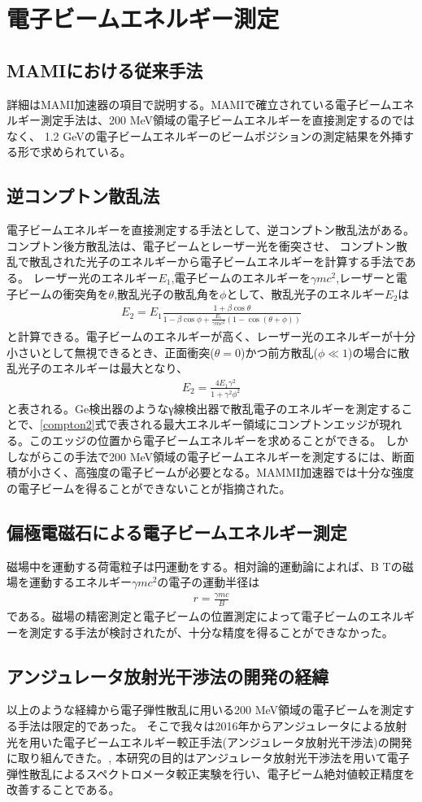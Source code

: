 \documentclass[a4paper,11pt,uplatex]{jsbook}
\begin{document}
\section{電子ビームエネルギー測定}
\subsection{MAMIにおける従来手法}
詳細はMAMI加速器の項目で説明する。MAMIで確立されている電子ビームエネルギー測定手法は、200 MeV領域の電子ビームエネルギーを直接測定するのではなく、
1.2 GeVの電子ビームエネルギーのビームポジションの測定結果を外挿する形で求められている。
\subsection{逆コンプトン散乱法}
電子ビームエネルギーを直接測定する手法として、逆コンプトン散乱法がある。コンプトン後方散乱法は、電子ビームとレーザー光を衝突させ、
コンプトン散乱で散乱された光子のエネルギーから電子ビームエネルギーを計算する手法である。
レーザー光のエネルギー$E_1$,電子ビームのエネルギーを$\gamma mc^2$,レーザーと電子ビームの衝突角を$\theta$,散乱光子の散乱角を$\phi$として、散乱光子のエネルギー$E_2$は
\begin{eqnarray}
  E_2 = E_1\frac{1+\beta\cos{\theta}}{1-\beta\cos{\phi} + \frac{E_1}{\gamma mc^2} (1-\cos{(\theta +\phi)})} \label{compton}
\end{eqnarray}
と計算できる。電子ビームのエネルギーが高く、レーザー光のエネルギーが十分小さいとして無視できるとき、正面衝突($\theta = 0$)かつ前方散乱($\phi \ll 1$)の場合に散乱光子のエネルギーは最大となり、
\begin{eqnarray}
  E_2 = \frac{4E_1\gamma^2}{1 + \gamma^2\phi^2} \label{compton2}
\end{eqnarray}
と表される。Ge検出器のようなγ線検出器で散乱電子のエネルギーを測定することで、\ref{compton2}式で表される最大エネルギー領域にコンプトンエッジが現れる。このエッジの位置から電子ビームエネルギーを求めることができる。
しかしながらこの手法で200 MeV領域の電子ビームエネルギーを測定するには、断面積が小さく、高強度の電子ビームが必要となる。MAMMI加速器では十分な強度の電子ビームを得ることができないことが指摘された。
\subsection{偏極電磁石による電子ビームエネルギー測定}
磁場中を運動する荷電粒子は円運動をする。相対論的運動論によれば、B Tの磁場を運動するエネルギー$\gamma mc^2$の電子の運動半径は
\begin{eqnarray}
  r = \frac{\gamma mc}{B}
\end{eqnarray}
である。磁場の精密測定と電子ビームの位置測定によって電子ビームのエネルギーを測定する手法が検討されたが、十分な精度を得ることができなかった。
\subsection{アンジュレータ放射光干渉法の開発の経緯}
以上のような経緯から電子弾性散乱に用いる200 MeV領域の電子ビームを測定する手法は限定的であった。
そこで我々は2016年からアンジュレータによる放射光を用いた電子ビームエネルギー較正手法(アンジュレータ放射光干渉法)の開発に取り組んできた。\cite{klag2018},\cite{klag2023}
本研究の目的はアンジュレータ放射光干渉法を用いて電子弾性散乱によるスペクトロメータ較正実験を行い、電子ビーム絶対値較正精度を改善することである。
\end{document}
